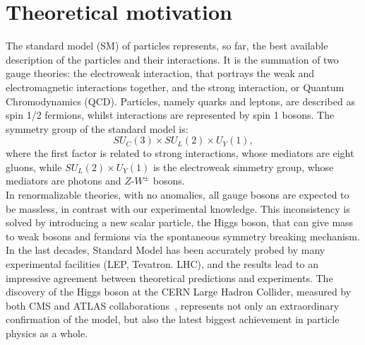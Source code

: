 \chapter{Theoretical motivation}
\label{chap:theory}

The standard model (SM) of particles represents, so far, the best available description of the particles and their interactions. It is the summation of two gauge theories: the electroweak interaction, that portrays the weak and electromagnetic interactions together, and the strong interaction, or Quantum Chromodynamics (QCD). Particles, namely quarks and leptons, are described as spin 1/2 fermions, whilst interactions are represented by spin 1 bosons. The symmetry group of the standard model is:
\begin{equation}
SU_{C}(3) \times SU_L (2) \times U_Y (1),
\end{equation}
\label{eq:theory_SMgroup}
where the first factor is related to strong interactions, whose mediators are eight gluons, while $SU_L (2) \times U_Y (1)$ is the electroweak simmetry group, whose mediators are photons and $Z$-$W^{\pm}$ bosons.\\
In renormalizable theories, with no anomalies, all gauge bosons are expected to be massless, in contrast with our experimental knowledge. This inconsistency is solved by introducing a new scalar particle, the Higgs boson, that can give mass to weak bosons and fermions via the spontaneous symmetry breaking mechanism.
\\

In the last decades, Standard Model has been accurately probed by many experimental facilities (LEP, Tevatron. LHC), and the results lead to an impressive agreement between theoretical predictions and experiments. The discovery of the Higgs boson at the CERN Large Hadron Collider, measured by both CMS and ATLAS collaborations~\cite{bib:Aad20121,bib:Chatrchyan201230,bib:Chatrchyan2013lba,Aad:2013xqa,Khachatryan:2014jba,Aad:2014aba,Aad:2015zhl}, represents not only an extraordinary confirmation of the model, but also the latest biggest achievement in particle physics as a whole.


